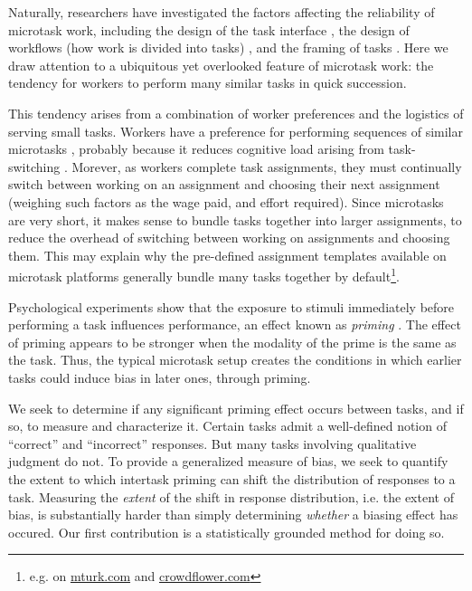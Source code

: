 \documentclass{sigchi}
\begin{document}
Naturally, researchers have investigated the factors affecting the 
reliability of microtask work, including the design of the task interface
\cite{Finnerty2013},
the design of workflows (how work is divided into tasks)
\cite{kittur2011crowdforge,Huang201077,laseckieffects},
and the framing of tasks
\cite{Kinnaird2012281,chandler2013breaking,thibodeau2013natural}.
Here we draw attention to a ubiquitous yet overlooked feature of microtask 
work: the tendency for workers to perform many similar tasks in quick 
succession.  

This tendency arises from a combination of worker preferences and the 
logistics of serving small tasks.  
Workers have a preference for performing sequences of similar microtasks
\cite{Chilton20101}, probably because it reduces 
cognitive load arising from task-switching \cite{Adamczyk2004271}.
Morever, as workers complete task assignments, they must continually 
switch between working on an assignment and choosing their next 
assignment (weighing such factors as the wage paid, and effort required).  
Since microtasks are very short,
it makes sense to bundle tasks together into
larger assignments, to reduce the overhead of switching between  
working on assignments and choosing them.
This may explain why the pre-defined assignment templates available on 
microtask platforms generally bundle many tasks together by 
default\footnote{e.g. on \url{mturk.com} and \url{crowdflower.com}}.

Psychological experiments show that the exposure to stimuli immediately 
before performing a task influences performance, an effect known as 
\textit{priming} \cite{BJOP1796}.
The effect of priming appears to be stronger when the modality of the
prime is the same as the task.
Thus, the typical microtask setup creates the conditions in which
earlier tasks could induce bias in later ones, through priming.

We seek to determine if any significant priming effect occurs between
tasks, and if so, to measure and characterize it.
Certain tasks admit a well-defined notion of ``correct'' and 
``incorrect'' responses.  But many tasks involving qualitative judgment
do not.  To provide a generalized measure of bias, we seek to quantify the
extent to which intertask priming can shift the distribution of responses 
to a task.  
Measuring the \textit{extent} of the shift in response distribution,
i.e. the extent of bias, is substantially harder than
simply determining \textit{whether} a biasing effect has occured.  
Our first contribution is a statistically grounded method for doing so.
\end{document}
